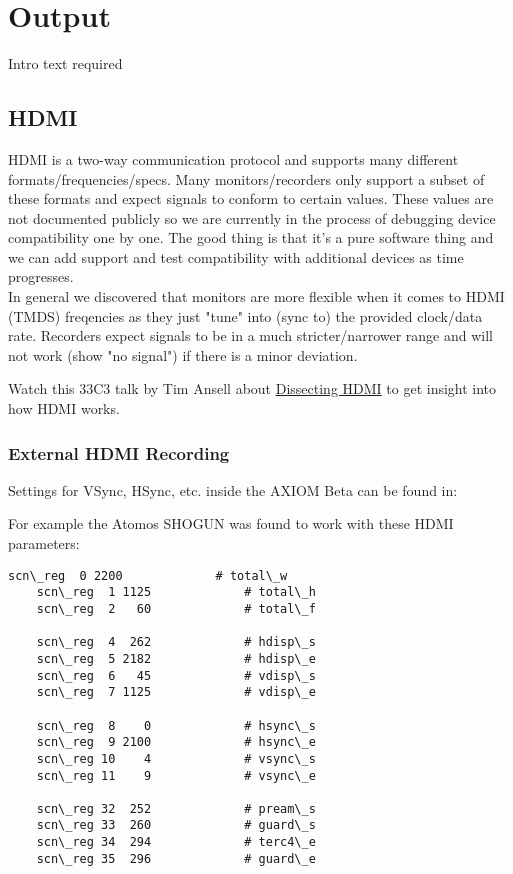 \section{Output}

Intro text required



\subsection{HDMI}

HDMI is a two-way communication protocol and supports many different formats/frequencies/specs. Many monitors/recorders only support a subset of these formats and expect signals to conform to certain values. These values are not documented publicly so we are currently in the process of debugging device compatibility one by one. The good thing is that it's a pure software thing and we can add support and test compatibility with additional devices as time progresses.\\

In general we discovered that monitors are more flexible when it comes to HDMI (TMDS) freqencies as they just "tune" into (sync to) the provided clock/data rate. Recorders expect signals to be in a much stricter/narrower range and will not work (show "no signal") if there is a minor deviation. 

Watch this 33C3 talk by Tim Ansell about \href{https://media.ccc.de/v/33c3-8057-dissecting_hdmi}{Dissecting HDMI} to get insight into how HDMI works.


\subsubsection{External HDMI Recording}

Settings for VSync, HSync, etc. inside the AXIOM Beta can be found in: 


For example the Atomos SHOGUN was found to work with these HDMI parameters:  
   
\begin{lstlisting}[breaklines=true, breakatwhitespace=true]
scn\_reg  0 2200             # total\_w
    scn\_reg  1 1125             # total\_h
    scn\_reg  2   60             # total\_f
     
    scn\_reg  4  262             # hdisp\_s
    scn\_reg  5 2182             # hdisp\_e
    scn\_reg  6   45             # vdisp\_s
    scn\_reg  7 1125             # vdisp\_e
     
    scn\_reg  8    0             # hsync\_s
    scn\_reg  9 2100             # hsync\_e
    scn\_reg 10    4             # vsync\_s
    scn\_reg 11    9             # vsync\_e
     
    scn\_reg 32  252             # pream\_s
    scn\_reg 33  260             # guard\_s
    scn\_reg 34  294             # terc4\_e
    scn\_reg 35  296             # guard\_e
\end{lstlisting}
   

